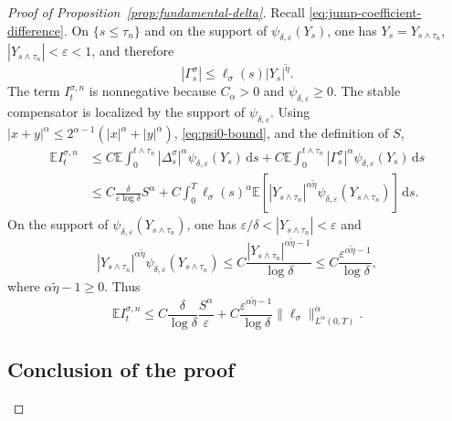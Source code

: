 \documentclass[10pt,a4paper]{amsart}
\newcommand{\E}{\mathbb{E}}
\newcommand{\1}{\mathbf{1}}
\newcommand{\dd}{\,\mathrm{d}}
\newcommand{\wt}{\tilde}
\newcommand{\eps}{\varepsilon}
\begin{document}
\begin{proof}[Proof of Proposition~\ref{prop:fundamental-delta}]
Recall \eqref{eq:jump-coefficient-difference}. On $\{s\le\tau_n\}$ and on the support of $\psi_{\delta,\eps}(Y_s)$, one has $Y_s=Y_{s\wedge\tau_n}$, $|Y_{s\wedge\tau_n}|<\eps<1$, and therefore
\[
  |\Gamma_s^\sigma|\le \ell_\sigma(s)|Y_s|^{\wt\eta}.
\]
The term $I_t^{\sigma,n}$ is nonnegative because $C_\alpha>0$ and $\psi_{\delta,\eps}\ge0$. The stable compensator is localized by the support of $\psi_{\delta,\eps}$. Using $|x+y|^\alpha\le2^{\alpha-1}(|x|^\alpha+|y|^\alpha)$, \eqref{eq:psi0-bound}, and the definition of $S$,
\begin{align*}
\E I_t^{\sigma,n}
&\le C\E\int_0^{t\wedge\tau_n}|\Delta_s^\sigma|^\alpha\psi_{\delta,\eps}(Y_s)\dd s
+C\E\int_0^{t\wedge\tau_n}|\Gamma_s^\sigma|^\alpha\psi_{\delta,\eps}(Y_s)\dd s\\
&\le C\frac{\delta}{\eps\log\delta}S^\alpha
+C\int_0^T \ell_\sigma(s)^\alpha\E\left[|Y_{s\wedge\tau_n}|^{\alpha\wt\eta}\psi_{\delta,\eps}(Y_{s\wedge\tau_n})\right]\dd s.
\end{align*}
On the support of $\psi_{\delta,\eps}(Y_{s\wedge\tau_n})$, one has
$\eps/\delta<|Y_{s\wedge\tau_n}|<\eps$ and
\[
|Y_{s\wedge\tau_n}|^{\alpha\wt\eta}\psi_{\delta,\eps}(Y_{s\wedge\tau_n})
\le C\frac{|Y_{s\wedge\tau_n}|^{\alpha\wt\eta-1}}{\log\delta}
\le C\frac{\eps^{\alpha\wt\eta-1}}{\log\delta},
\]
where $\alpha\wt\eta-1\ge0$. Thus
\begin{equation}\label{eq:stable-estimate}
\E I_t^{\sigma,n}
\le C\frac{\delta}{\log\delta}\frac{S^\alpha}{\eps}
+C\frac{\eps^{\alpha\wt\eta-1}}{\log\delta}\|\ell_\sigma\|_{L^\alpha(0,T)}^\alpha.
\end{equation}

\subsection{Conclusion of the proof}
\label{subsec:proof-conclusion}


\end{proof}
\end{document}
